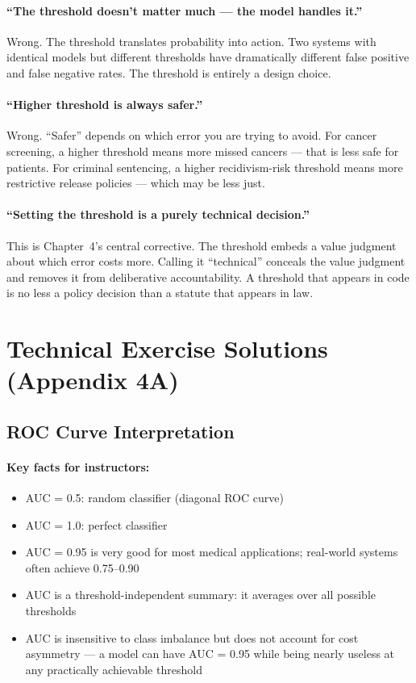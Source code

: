 \paragraph{``The threshold doesn't matter much --- the model handles it.''}
Wrong. The threshold translates probability into action. Two systems with identical models but different thresholds have dramatically different false positive and false negative rates. The threshold is entirely a design choice.

\paragraph{``Higher threshold is always safer.''}
Wrong. ``Safer'' depends on which error you are trying to avoid. For cancer screening, a higher threshold means more missed cancers --- that is less safe for patients. For criminal sentencing, a higher recidivism-risk threshold means more restrictive release policies --- which may be less just.

\paragraph{``Setting the threshold is a purely technical decision.''}
This is Chapter~4's central corrective. The threshold embeds a value judgment about which error costs more. Calling it ``technical'' conceals the value judgment and removes it from deliberative accountability. A threshold that appears in code is no less a policy decision than a statute that appears in law.

\section{Technical Exercise Solutions (Appendix 4A)}

\subsection{ROC Curve Interpretation}

\paragraph{Key facts for instructors:}
\begin{itemize}
    \item AUC = 0.5: random classifier (diagonal ROC curve)
    \item AUC = 1.0: perfect classifier
    \item AUC = 0.95 is very good for most medical applications; real-world systems often achieve 0.75--0.90
    \item AUC is a threshold-independent summary: it averages over all possible thresholds
    \item AUC is insensitive to class imbalance but does not account for cost asymmetry --- a model can have AUC = 0.95 while being nearly useless at any practically achievable threshold
\end{itemize}

